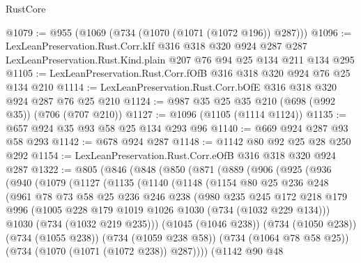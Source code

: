 \begin{lexlean}{RustCore}
\begin{coremodule}
@1079 := @955 (@1069 (@734 (@1070 (@1071 (@1072 @196)) @287)))
@1096 := LexLeanPreservation.Rust.Corr.kIf
    @316
    @318
    @320
    @924
    @287
    @287
    LexLeanPreservation.Rust.Kind.plain
    @207
    @76
    @94
    @25
    @134
    @211
    @134
    @295
@1105 := LexLeanPreservation.Rust.Corr.fOfB @316 @318 @320 @924 @76 @25 @134 @210
@1114 := LexLeanPreservation.Rust.Corr.bOfE @316 @318 @320 @924 @287 @76 @25 @210
@1124 := @987 @35 @25 @35 @210 (@698 (@992 @35)) (@706 (@707 @210))
@1127 := @1096 (@1105 (@1114 @1124))
@1135 := @657 @924 @35 @93 @58 @25 @134 @293 @96
@1140 := @669 @924 @287 @93 @58 @293
@1142 := @678 @924 @287
@1148 := @1142 @80 @92 @25 @28 @250 @292
@1154 := LexLeanPreservation.Rust.Corr.eOfB @316 @318 @320 @924 @287
@1322 := @805
    (@846
      (@848
        (@850
          (@871
            (@889
              (@906
                (@925
                  (@936
                    (@940
                      (@1079
                        (@1127
                          (@1135
                            (@1140
                              (@1148
                                (@1154
                                  @80
                                  @25
                                  @236
                                  @248
                                  (@961
                                    @78
                                    @73
                                    @58
                                    @25
                                    @236
                                    @246
                                    @238
                                    (@980
                                      @235
                                      @245
                                      @172
                                      @218
                                      @179
                                      @996
                                      (@1005 @228 @179 @1019 @1026 @1030 (@734 (@1032 @229 @134)))
                                      @1030
                                      (@734 (@1032 @219 @235)))
                                    (@1045 (@1046 @238))
                                    (@734 (@1050 @238))
                                    (@734 (@1055 @238))
                                    (@734 (@1059 @238 @58))
                                    (@734 (@1064 @78 @58 @25))
                                    (@734 (@1070 (@1071 (@1072 @238)) @287))))
                                (@1142
                                  @90
                                  @48

\end{coremodule}
\end{lexlean}
